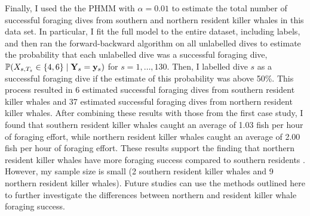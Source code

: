 Finally, I used the the PHMM with $\alpha = 0.01$ to estimate the total number of successful foraging dives from southern and northern resident killer whales in this data set. In particular, I fit the full model to the entire dataset, including labels, and then ran the forward-backward algorithm on all unlabelled dives to estimate the probability that each unlabelled dive was a successful foraging dive, $\mathbb{P}(X_{s,T_s} \in \{4,6\} \mid \mathbf{Y}_s = \mathbf{y}_s)$ for $s = 1,\ldots,130$. Then, I labelled dive $s$ as a successful foraging dive if the estimate of this probability was above 50\%. This process resulted in 6 estimated successful foraging dives from southern resident killer whales and 37 estimated successful foraging dives from northern resident killer whales. After combining these results with those from the first case study, I found that southern resident killer whales caught an average of 1.03 fish per hour of foraging effort, while northern resident killer whales caught an average of 2.00 fish per hour of foraging effort. These results support the finding that northern resident killer whales have more foraging success compared to southern residents \citep{Tennessen:2023}. However, my sample size is small (2 southern resident killer whales and 9 northern resident killer whales). Future studies can use the methods outlined here to further investigate the differences between northern and resident killer whale foraging success.